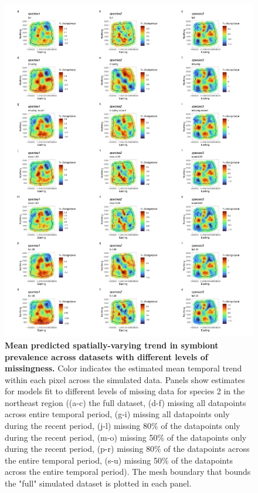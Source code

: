 \documentclass[11pt]{article}
\begin{document}
{\begin{figure}[htbp]
	\centering
	\includegraphics[width = .65\linewidth]{../Plots/sim_svc_plot.png}
	\caption[Mean predicted spatially-varying trend in symbiont prevalence across datasets with different levels of missingness]{\textbf{Mean predicted spatially-varying trend in symbiont prevalence across datasets with different levels of missingness.} Color indicates the estimated mean temporal trend within each pixel across the simulated data. Panels show estimates for models fit to different levels of missing data for species 2 in the northeast region ((a-c) the full dataset, (d-f) missing all datapoints across entire temporal period, (g-i) missing all datapoints only during the recent period, (j-l) missing 80\% of the datapoints  only during the recent period, (m-o)  missing 50\% of the datapoints  only during the recent period, (p-r) missing 80\% of the datapoints across the entire temporal period, (s-u) missing 50\% of the datapoints across the entire temporal period). The mesh boundary that bounds the "full" simulated dataset is plotted in each panel.}
	\label{fig:sim_svc_plot}
\end{figure}



}
\end{document}
